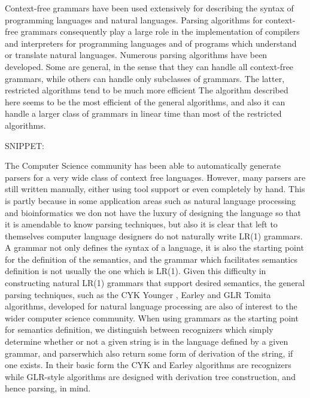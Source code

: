 \begin{isabellebody}
\begin{isamarkuptext}
Context-free grammars have been used extensively for describing the syntax of programming languages
and natural languages. Parsing algorithms for context-free grammars consequently play a large role in
the implementation of compilers and interpreters for programming languages and of programs which understand
or translate natural languages. Numerous parsing algorithms have been developed. Some are general,
in the sense that they can handle all context-free grammars, while others can handle only subclasses of
grammars. The latter, restricted algorithms tend to be much more efficient The algorithm described here
seems to be the most efficient of the general algorithms, and also it can handle a larger class of grammars
in linear time than most of the restricted algorithms.%
\end{isamarkuptext}\isamarkuptrue%
%
\begin{isamarkuptext}%
SNIPPET:

The Computer Science community has been able to automatically generate parsers for a very wide class of context
free languages. However, many parsers are still written manually, either using tool support or even completely
by hand. This is partly because in some application areas such as natural language processing and bioinformatics
we don not have the luxury of designing the language so that it is amendable to know parsing techniques, but also
it is clear that left to themselves computer language designers do not naturally write LR(1) grammars. A grammar
not only defines the syntax of a language, it is also the starting point for the definition of the semantics,
and the grammar which facilitates semantics definition is not usually the one which is LR(1). Given this difficulty
in constructing natural LR(1) grammars that support desired semantics, the general parsing techniques, such as
the CYK Younger \cite{Younger:1967}, Earley \cite{Earley:1970} and GLR Tomita \cite{Tomita:1985} algorithms, developed
for natural language processing are also of interest to the wider computer science community. When using grammars as
the starting point for semantics definition, we distinguish between recognizers which simply determine whether or not
a given string is in the language defined by a given grammar, and parserwhich also return some form of derivation
of the string, if one exists. In their basic form the CYK and Earley algorithms are recognizers while GLR-style
algorithms are designed with derivation tree construction, and hence parsing, in mind.


\end{isamarkuptext}
\end{isabellebody}
